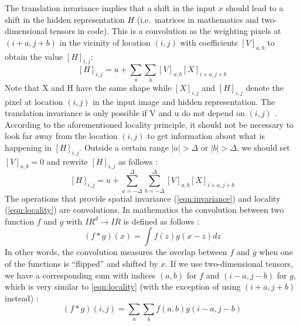 \documentclass[12pt,a4paper]{scrartcl}
\begin{document}
The translation invariance implies that a shift in the input \(x\) should lead to a shift in the hidden representation \(H\) (i.e.~matrices in mathematics and two-dimensional tensors in code). 
This is a convolution as the weighting pixels at \((i + a, j + b)\) in the vicinity of location
\((i, j)\) with coefficients \([V]_{a,b}\) to obtain the value \([H]_{i,j}\): 
\begin{equation}
\label{eqn:invariance}
[H]_{i,j} = u + \sum_a\sum_b[V]_{a,b}[X]_{i+a,j+b}
\end{equation}
Note that X and H have the same shape while \([X]_{i,j}\) and \([H]_{i,j}\) denote the pixel at location \((i, j)\) in the input image and hidden representation. The translation invariance is only possible if V and u do not depend on \((i, j)\) \cite{DIDLBook}.
According to the aforementioned locality principle, it should not be necessary to look far away from the location \((i, j)\) to get information about what is happening in \([H]_{i,j}\). Outside a certain range \(|a| > \Delta \) or \(|b| > \Delta\), we should set  \([V]_{a,b} = 0\) and rewrite \([H]_{i,j}\) as follows \cite{DIDLBook}:
\begin{equation}
\label{eqn:locality}
[H]_{i,j} = u + \sum_{a=-\Delta}^{\Delta}\sum_{b=-\Delta}^{\Delta}[V]_{a,b}[X]_{i+a,j+b}
\end{equation}
The operations that provide spatial invariance (\ref{eqn:invariance}) and locality (\ref{eqn:locality}) are convolutions. In mathematics the convolution between two function \(f\) and \(g\) with \({ I\!R}^d \rightarrow { I\!R}\) is defined as follows \cite{DIDLBook}: 
\begin{equation}
(f*g)(x) = \int f(z)g(x-z)dz
\end{equation}
In other words, the convolution measures the overlap between \(f\) and \(g\) when one of the functions is “flipped” and shifted by \(x\). If we use two-dimensional tensors, we have a corresponding sum with indices \((a, b)\) for \(f\) and \((i-a, j-b)\) for \(g\), which is very similar to \ref{eqn:locality} (with the exception of using \((i+a, j+b)\) instead) \cite{DIDLBook}:
\begin{equation}
(f*g)(i,j) = \sum_{a}\sum_{b} f(a,b)g(i-a,j-b)
\end{equation}
\end{document}
